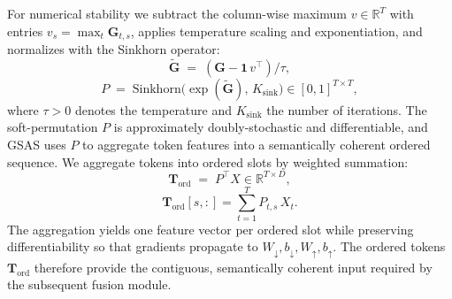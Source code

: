 For numerical stability we subtract the column-wise maximum \(v\in\mathbb{R}^T\) with entries \(v_s=\max_t \mathbf{G}_{t,s}\), applies temperature scaling and exponentiation, and normalizes with the Sinkhorn operator:
\begin{equation}
\tilde{\mathbf{G}} \;=\; (\mathbf{G} - \mathbf{1}\,v^\top)/\tau,
\end{equation}
\begin{equation}
P \;=\; \mathrm{Sinkhorn}\big(\exp(\tilde{\mathbf{G}}),\,K_{\mathrm{sink}}\big)\in[0,1]^{T\times T},
\end{equation}
where \(\tau>0\) denotes the temperature and \(K_{\mathrm{sink}}\) the number of iterations. The soft-permutation \(P\) is approximately doubly-stochastic and differentiable, and GSAS uses \(P\) to aggregate token features into a semantically coherent ordered sequence. We aggregate tokens into ordered slots by weighted summation:
\begin{equation}
\mathbf{T}_{\mathrm{ord}} \;=\; P^\top X \in\mathbb{R}^{T\times D},
\end{equation}
\begin{equation}
\mathbf{T}_{\mathrm{ord}}[s,:]=\sum_{t=1}^T P_{t,s}\,X_t.
\end{equation}
The aggregation yields one feature vector per ordered slot while preserving differentiability so that gradients propagate to \(W_{\downarrow},b_{\downarrow},W_{\uparrow},b_{\uparrow}\). The ordered tokens \( \mathbf{T}_{\mathrm{ord}}\) therefore provide the contiguous, semantically coherent input required by the subsequent fusion module.


